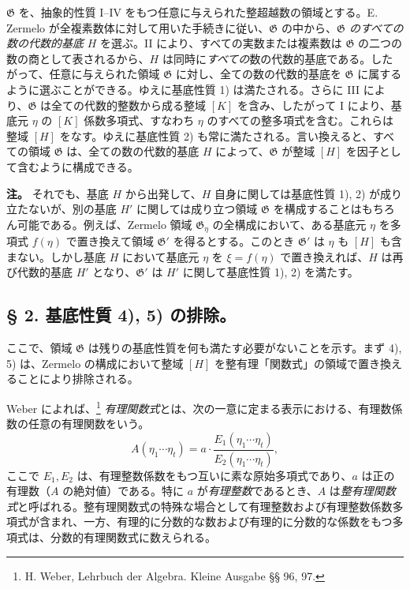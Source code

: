 $\mathfrak G$ を、抽象的性質 I--IV をもつ任意に与えられた整超越数の領域とする。E. Zermelo が全複素数体に対して用いた手続きに従い、$\mathfrak G$ の中から、\emph{$\mathfrak G$ のすべての数の代数的基底} $H$ を選ぶ。II により、すべての実数または複素数は $\mathfrak G$ の二つの数の商として表されるから、$H$ は同時に\emph{すべての}数の代数的基底である。したがって、任意に与えられた領域 $\mathfrak G$ に対し、全ての数の代数的基底を $\mathfrak G$ に属するように選ぶことができる。ゆえに基底性質 1) は満たされる。さらに III により、$\mathfrak G$ は全ての代数的整数から成る整域 $[K]$ を含み、したがって I により、基底元 $\eta$ の $[K]$ 係数多項式、すなわち $\eta$ のすべての整多項式を含む。これらは整域 $[H]$ をなす。ゆえに基底性質 2) も常に満たされる。言い換えると、すべての領域 $\mathfrak G$ は、全ての数の代数的基底 $H$ によって、$\mathfrak G$ が整域 $[H]$ を因子として含むように構成できる。

\textbf{注。} それでも、基底 $H$ から出発して、$H$ 自身に関しては基底性質 1), 2) が成り立たないが、別の基底 $H'$ に関しては成り立つ領域 $\mathfrak G$ を構成することはもちろん可能である。例えば、Zermelo 領域 $\mathfrak G_\eta$ の全構成において、ある基底元 $\eta$ を多項式 $f(\eta)$ で置き換えて領域 $\mathfrak G'$ を得るとする。このとき $\mathfrak G'$ は $\eta$ も $[H]$ も含まない。しかし基底 $H$ において基底元 $\eta$ を $\xi=f(\eta)$ で置き換えれば、$H$ は再び代数的基底 $H'$ となり、$\mathfrak G'$ は $H'$ に関して基底性質 1), 2) を満たす。

\subsection*{§ 2. 基底性質 4), 5) の排除。}

ここで、領域 $\mathfrak G$ は残りの基底性質を何も満たす必要がないことを示す。まず 4), 5) は、Zermelo の構成において整域 $[H]$ を整有理「関数式」の領域で置き換えることにより排除される。

Weber によれば、\footnote{H. Weber, Lehrbuch der Algebra. Kleine Ausgabe §§ 96, 97.} \emph{有理関数式}とは、次の一意に定まる表示における、有理数係数の任意の有理関数をいう。
\[
 A(\eta_1\cdots \eta_t)
   = a\cdot\frac{E_1(\eta_1\cdots \eta_t)}{E_2(\eta_1\cdots \eta_t)},
\]
ここで $E_1,E_2$ は、有理整数係数をもつ互いに素な原始多項式であり、$a$ は正の有理数（$A$ の絶対値）である。特に $a$ が\emph{有理整数}であるとき、$A$ は\emph{整有理関数式}と呼ばれる。整有理関数式の特殊な場合として有理整数および有理整数係数多項式が含まれ、一方、有理的に分数的な数および有理的に分数的な係数をもつ多項式は、分数的有理関数式に数えられる。

